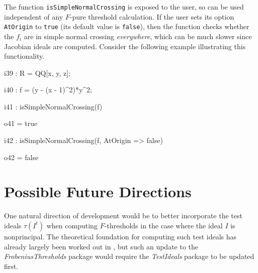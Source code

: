 \documentclass{amsart}
\begin{document}

The function \texttt{isSimpleNormalCrossing} is exposed to the user, so can be used independent of any $F$-pure threshold calculation.
If the user sets its option \texttt{AtOrigin} to \texttt{true} (its default value is \texttt{false}), then the function checks whether the $f_i$ are in simple normal crossing \emph{everywhere}, which can be much slower since Jacobian ideals are computed. Consider the following example illustrating this functionality.

\medskip
{\small
{}
\begin{MyVerbatim}
i39 : R = QQ[x, y, z];

i40 : f = (y - (x - 1)^2)*y^2; 

i41 : isSimpleNormalCrossing(f)

o41 = true

i42 : isSimpleNormalCrossing(f, AtOrigin => false)

o42 = false
\end{MyVerbatim}
}
\medskip












\section{Possible Future Directions}
\label{sec.FutureDirections}

One natural direction of development would be to better incorporate the test ideals $\tau(I^t)$ when computing $F$-thresholds in the case where the ideal $I$ is nonprincipal.
The theoretical foundation for computing such test ideals has already largely been worked out in \cite{SchwedeTuckerTestIdealsOfNonPrincipal}, but such an update to the \emph{FrobeniusThresholds} package would require the  \emph{TestIdeals} package to be updated first.
\end{document}
